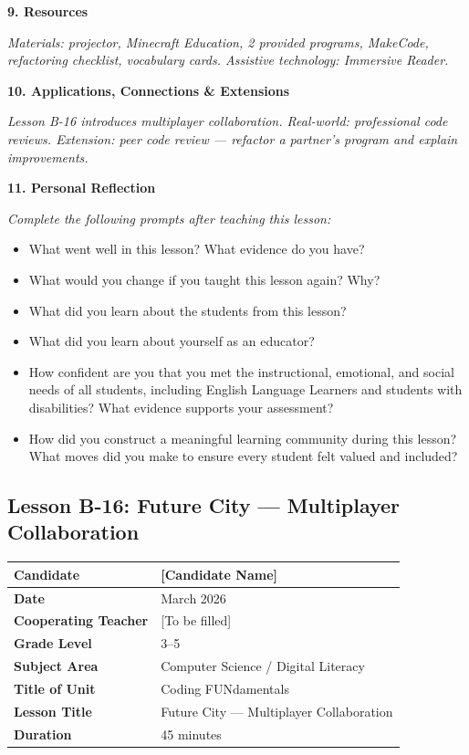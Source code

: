 \documentclass[11pt,letterpaper]{article}
\begin{document}
\textbf{9. Resources}

\textit{Materials: projector, Minecraft Education, 2 provided programs, MakeCode, refactoring checklist, vocabulary cards. Assistive technology: Immersive Reader.}

\textbf{10. Applications, Connections \& Extensions}

\textit{Lesson B-16 introduces multiplayer collaboration. Real-world: professional code reviews. Extension: peer code review --- refactor a partner's program and explain improvements.}

\textbf{11. Personal Reflection}

\textit{Complete the following prompts after teaching this lesson:}

\begin{itemize}
  \item What went well in this lesson? What evidence do you have?

  \item What would you change if you taught this lesson again? Why?

  \item What did you learn about the students from this lesson?

  \item What did you learn about yourself as an educator?

  \item How confident are you that you met the instructional, emotional, and social needs of all students, including English Language Learners and students with disabilities? What evidence supports your assessment?

  \item How did you construct a meaningful learning community during this lesson? What moves did you make to ensure every student felt valued and included?
\end{itemize}

\newpage
\subsection{Lesson B-16: Future City --- Multiplayer Collaboration}
\label{sub:LessonB16FutureCityMultiplayerCollaboration}

\begin{longtable}{|L{0.28\textwidth}|L{0.65\textwidth}|}
\hline
\textbf{Candidate}  & [Candidate Name]  \\
\hline
\textbf{Date}  & March 2026  \\
\hline
\textbf{Cooperating Teacher}  & [To be filled]  \\
\hline
\textbf{Grade Level}  & 3--5  \\
\hline
\textbf{Subject Area}  & Computer Science / Digital Literacy  \\
\hline
\textbf{Title of Unit}  & Coding FUNdamentals  \\
\hline
\textbf{Lesson Title}  & Future City --- Multiplayer Collaboration  \\
\hline
\textbf{Duration}  & 45 minutes  \\
\hline
\end{longtable}
\end{document}
